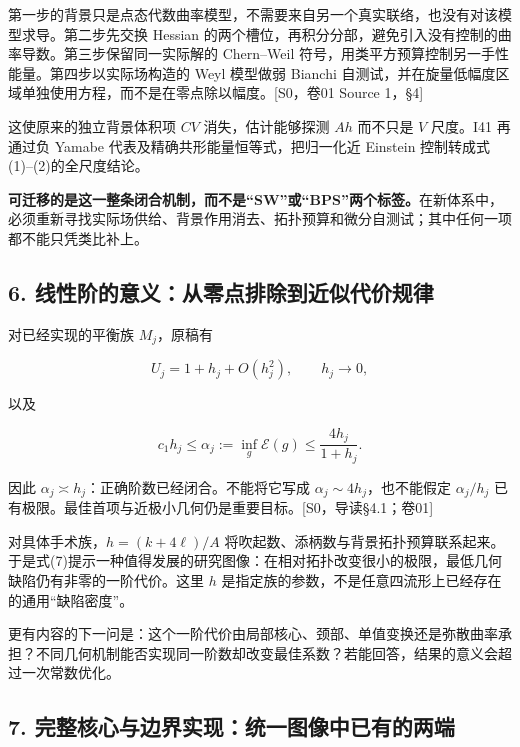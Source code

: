 \documentclass[UTF8,a4paper,11pt,fontset=fandol]{ctexart}
\begin{document}
第一步的背景只是点态代数曲率模型，不需要来自另一个真实联络，也没有对该模型求导。第二步先交换
Hessian
的两个槽位，再积分分部，避免引入没有控制的曲率导数。第三步保留同一实际解的
Chern--Weil 符号，用类平方预算控制另一手性能量。第四步以实际场构造的
Weyl 模型做弱 Bianchi
自测试，并在旋量低幅度区域单独使用方程，而不是在零点除以幅度。{[}S0，卷01
Source 1，§4{]}

这使原来的独立背景体积项 \(CV\) 消失，估计能够探测 \(Ah\) 而不只是 \(V\)
尺度。I41 再通过负 Yamabe 代表及精确共形能量恒等式，把归一化近 Einstein
控制转成式(1)--(2)的全尺度结论。

\textbf{可迁移的是这一整条闭合机制，而不是``SW''或``BPS''两个标签。}在新体系中，必须重新寻找实际场供给、背景作用消去、拓扑预算和微分自测试；其中任何一项都不能只凭类比补上。

\subsection{6.
线性阶的意义：从零点排除到近似代价规律}\label{ux7ebfux6027ux9636ux7684ux610fux4e49ux4eceux96f6ux70b9ux6392ux9664ux5230ux8fd1ux4f3cux4ee3ux4ef7ux89c4ux5f8b}

对已经实现的平衡族 \(M_j\)，原稿有

\[
U_j=1+h_j+O(h_j^2),\qquad h_j\to0,
\]

以及

\[
\boxed{c_1h_j\le\alpha_j:=\inf_g\mathcal E(g)
\le\frac{4h_j}{1+h_j}.}
\tag{7}
\]

因此 \(\alpha_j\asymp h_j\)：正确阶数已经闭合。不能将它写成
\(\alpha_j\sim4h_j\)，也不能假定 \(\alpha_j/h_j\)
已有极限。最佳首项与近极小几何仍是重要目标。{[}S0，导读§4.1；卷01{]}

对具体手术族，\(h=(k+4\ell)/A\)
将吹起数、添柄数与背景拓扑预算联系起来。于是式(7)提示一种值得发展的研究图像：在相对拓扑改变很小的极限，最低几何缺陷仍有非零的一阶代价。这里
\(h\) 是指定族的参数，不是任意四流形上已经存在的通用``缺陷密度''。

更有内容的下一问是：这个一阶代价由局部核心、颈部、单值变换还是弥散曲率承担？不同几何机制能否实现同一阶数却改变最佳系数？若能回答，结果的意义会超过一次常数优化。

\subsection{7.
完整核心与边界实现：统一图像中已有的两端}\label{ux5b8cux6574ux6838ux5fc3ux4e0eux8fb9ux754cux5b9eux73b0ux7edfux4e00ux56feux50cfux4e2dux5df2ux6709ux7684ux4e24ux7aef}
\end{document}
